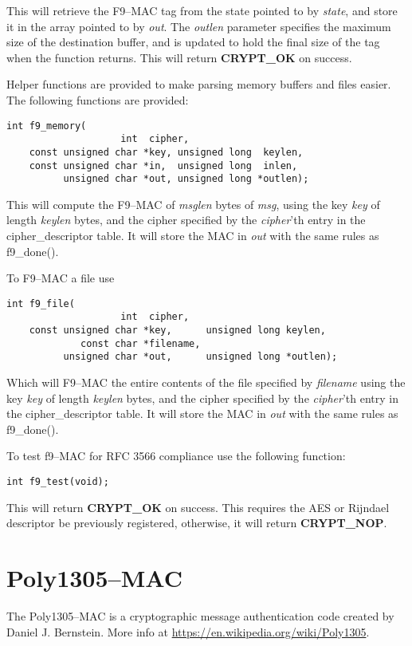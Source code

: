 \documentclass[synpaper]{book}
\newcommand{\mysection}[1]    %
	{                   %
	\section{#1}
   \markboth{\textsf{www.libtom.net}}{\thesection ~ {#1}}
	}
\begin{document}
This will retrieve the F9--MAC tag from the state pointed to by \textit{state}, and store it in the array pointed to by \textit{out}.  The \textit{outlen} parameter
specifies the maximum size of the destination buffer, and is updated to hold the final size of the tag when the function returns.  This will return
\textbf{CRYPT\_OK} on success.

Helper functions are provided to make parsing memory buffers and files easier.  The following functions are provided:

\begin{verbatim}
int f9_memory(
                    int  cipher,
    const unsigned char *key, unsigned long  keylen,
    const unsigned char *in,  unsigned long  inlen,
          unsigned char *out, unsigned long *outlen);
\end{verbatim}
This will compute the F9--MAC of \textit{msglen} bytes of \textit{msg}, using the key \textit{key} of length \textit{keylen} bytes, and the cipher
specified by the \textit{cipher}'th entry in the cipher\_descriptor table.  It will store the MAC in \textit{out} with the same rules as f9\_done().

To F9--MAC a file use
\begin{verbatim}
int f9_file(
                    int  cipher,
    const unsigned char *key,      unsigned long keylen,
             const char *filename,
          unsigned char *out,      unsigned long *outlen);
\end{verbatim}

Which will F9--MAC the entire contents of the file specified by \textit{filename} using the key \textit{key} of length \textit{keylen} bytes, and the cipher
specified by the \textit{cipher}'th entry in the cipher\_descriptor table.  It will store the MAC in \textit{out} with the same rules as f9\_done().


To test f9--MAC for RFC 3566 compliance use the following function:

\begin{verbatim}
int f9_test(void);
\end{verbatim}

This will return \textbf{CRYPT\_OK} on success.  This requires the AES or Rijndael descriptor be previously registered, otherwise, it will return
\textbf{CRYPT\_NOP}.

\mysection{Poly1305--MAC}

The Poly1305--MAC is a cryptographic message authentication code created by Daniel J. Bernstein.
More info at \url{https://en.wikipedia.org/wiki/Poly1305}.
\end{document}
